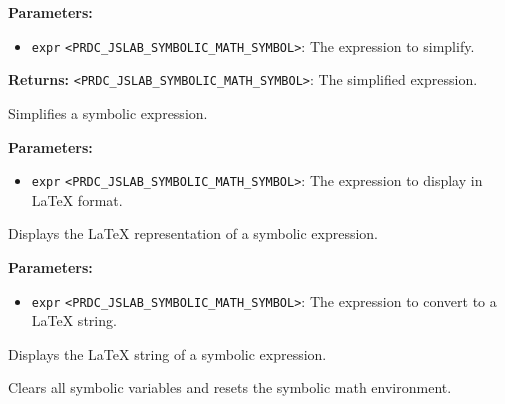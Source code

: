 \documentclass[12pt,a4paper]{article}
\begin{document}
\noindent \textbf{Parameters:}
\begin{itemize}
  \item \texttt{expr} \texttt{<PRDC\_JSLAB\_SYMBOLIC\_MATH\_SYMBOL>}: The expression to simplify.
\end{itemize}

\noindent \textbf{Returns:} \texttt{<PRDC\_JSLAB\_SYMBOLIC\_MATH\_SYMBOL>}: The simplified expression.

\noindent Simplifies a symbolic expression.

\vspace{5mm}
\noindent {}


\noindent \textbf{Parameters:}
\begin{itemize}
  \item \texttt{expr} \texttt{<PRDC\_JSLAB\_SYMBOLIC\_MATH\_SYMBOL>}: The expression to display in LaTeX format.
\end{itemize}

\noindent Displays the LaTeX representation of a symbolic expression.

\vspace{5mm}
\noindent {}


\noindent \textbf{Parameters:}
\begin{itemize}
  \item \texttt{expr} \texttt{<PRDC\_JSLAB\_SYMBOLIC\_MATH\_SYMBOL>}: The expression to convert to a LaTeX string.
\end{itemize}

\noindent Displays the LaTeX string of a symbolic expression.

\vspace{5mm}
\noindent {}


\noindent Clears all symbolic variables and resets the symbolic math environment.




\end{document}
